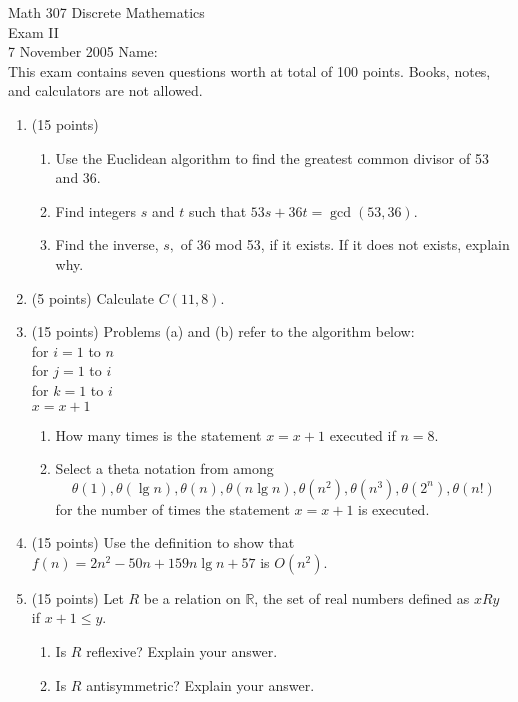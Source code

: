 \documentclass{amsart}
\newcommand{\real}{\mathbb{R}}
\begin{document}
\noindent Math 307 Discrete Mathematics\\
Exam II \\
7 November 2005 \hfill Name:{\underline{\hspace{2in}}} \\

This exam contains seven questions worth at total of 100 points.
Books, notes, and calculators are not allowed.

\begin{enumerate}
\item (15 points)\begin{enumerate}
\item Use the Euclidean algorithm to find the greatest common
divisor of 53 and 36.\vfill
\item Find integers $s$ and $t$ such that
$53s+36t=\gcd(53,36).$\vfill
\item Find the inverse, $s,$ of 36 mod 53, if it exists. If it does
not exists, explain why.\vfill\end{enumerate}
\newpage

\item (5 points) Calculate $C(11,8).$\vfill


\item (15 points) Problems (a) and (b) refer to the algorithm
below:\\


\noindent for $i=1$ to $n$\\
\indent for $j=1$ to $i$\\
\indent \indent for $k=1$ to $i$\\
\indent \indent \indent $x=x+1$\\

\begin{enumerate}
\item How many times is the statement $x=x+1$ executed if $n=8.$
\vfill
\item Select a theta notation from among $$ \theta(1), \theta(\lg n), \theta(n),
\theta(n\lg n), \theta(n^2), \theta(n^3), \theta(2^n), \theta(n!) $$
for the number of times the statement $x=x+1$ is executed.\vfill
\end{enumerate}\newpage

\item (15 points) Use the definition to show that
$f(n)=2n^2-50n+159n \lg n + 57$ is $O(n^2).$ \vfill

\item (15 points) Let $R$ be a relation on $\real$, the set of real
numbers defined as $x R y$ if $x+1 \leq y.$
\begin{enumerate}
\item Is $R$ reflexive? Explain your answer. \vfill
\item Is $R$ antisymmetric? Explain your answer. \vfill
\end{enumerate} \newpage


\end{enumerate}
\end{document}
